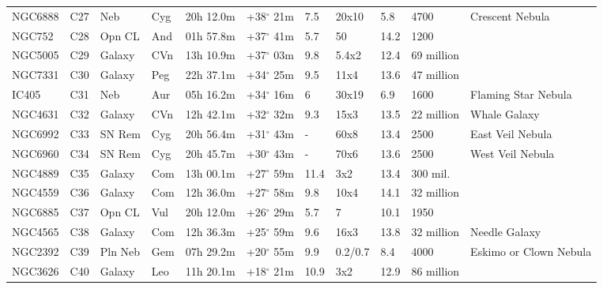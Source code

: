 \begin{longtable}{@{}lllllllllll@{}}
NGC6888    & C27           & Neb     & Cyg & 20h 12.0m & +38$^{\circ}$ 21m & 7.5  & 20x10          & 5.8  & 4700          & Crescent Nebula                 \\
NGC752     & C28           & Opn CL  & And & 01h 57.8m & +37$^{\circ}$ 41m & 5.7  & 50             & 14.2 & 1200          &                                 \\
NGC5005    & C29           & Galaxy  & CVn & 13h 10.9m & +37$^{\circ}$ 03m & 9.8  & 5.4x2          & 12.4 & 69 million    &                                 \\
NGC7331    & C30           & Galaxy  & Peg & 22h 37.1m & +34$^{\circ}$ 25m & 9.5  & 11x4           & 13.6 & 47 million    &                                 \\
IC405      & C31           & Neb     & Aur & 05h 16.2m & +34$^{\circ}$ 16m & 6    & 30x19          & 6.9  & 1600          & Flaming Star Nebula             \\
NGC4631    & C32           & Galaxy  & CVn & 12h 42.1m & +32$^{\circ}$ 32m & 9.3  & 15x3           & 13.5 & 22 million    & Whale Galaxy                    \\
NGC6992    & C33           & SN Rem  & Cyg & 20h 56.4m & +31$^{\circ}$ 43m & -    & 60x8           & 13.4 & 2500          & East Veil Nebula                \\
NGC6960    & C34           & SN Rem  & Cyg & 20h 45.7m & +30$^{\circ}$ 43m & -    & 70x6           & 13.6 & 2500          & West Veil Nebula                \\
NGC4889    & C35           & Galaxy  & Com & 13h 00.1m & +27$^{\circ}$ 59m & 11.4 & 3x2            & 13.4 & 300 mil.      &                                 \\
NGC4559    & C36           & Galaxy  & Com & 12h 36.0m & +27$^{\circ}$ 58m & 9.8  & 10x4           & 14.1 & 32 million    &                                 \\
NGC6885    & C37           & Opn CL  & Vul & 20h 12.0m & +26$^{\circ}$ 29m & 5.7  & 7              & 10.1 & 1950          &                                 \\
NGC4565    & C38           & Galaxy  & Com & 12h 36.3m & +25$^{\circ}$ 59m & 9.6  & 16x3           & 13.8 & 32 million    & Needle Galaxy                   \\
NGC2392    & C39           & Pln Neb & Gem & 07h 29.2m & +20$^{\circ}$ 55m & 9.9  & 0.2/0.7        & 8.4  & 4000          & Eskimo or Clown Nebula          \\
NGC3626    & C40           & Galaxy  & Leo & 11h 20.1m & +18$^{\circ}$ 21m & 10.9 & 3x2            & 12.9 & 86 million    &                                 \\

\end{longtable}
